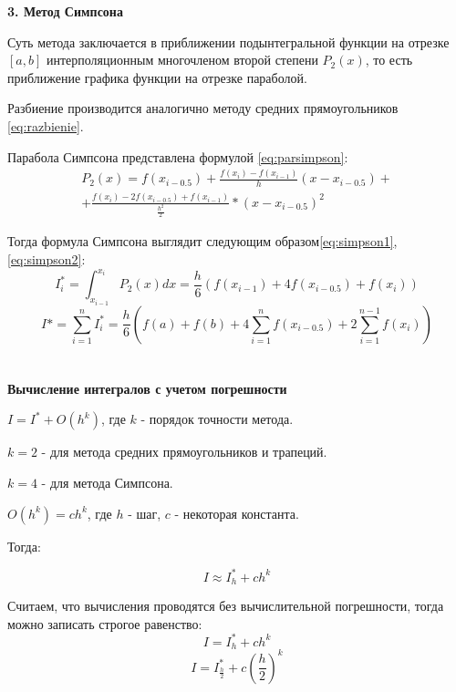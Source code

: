 \documentclass[a4paper, 12pt]{article}   	%
\begin{document}
\textbf{3. Метод Симпсона}

Суть метода заключается в приближении подынтегральной функции на отрезке $[a, b]$
интерполяционным многочленом второй степени $P_2(x)$, то есть приближение графика функции на отрезке параболой.

Разбиение производится аналогично методу средних прямоугольников \eqref{eq:razbienie}.

Парабола Симпсона представлена формулой \eqref{eq:parsimpson}:
\begin{multline}\label{eq:parsimpson}
P_2(x) = f(x_{i-0.5}) + \frac{f(x_i) - f(x_{i-1})}{h}(x-x_{i-0.5}) + \\ 
+ \frac{f(x_i) - 2f(x_{i-0.5}) + f(x_{i-1})}{\frac{h^2}{2}}*(x-x_{i-0.5})^2
\end{multline}

Тогда формула Симпсона выглядит следующим образом\eqref{eq:simpson1}, \eqref{eq:simpson2}:
\begin{equation}\label{eq:simpson1}
I^*_i = \int_{x_{i-1}}^{x_i} P_2(x)dx = \frac{h}{6} (f(x_{i-1}) + 4 f(x_{i-0.5}) + f(x_i))
\end{equation}
\begin{equation}\label{eq:simpson2}
I* = \sum_{i=1}^{n} I^*_i = \frac{h}{6} (f(a) + f(b) + 4\sum_{i=1}^n f(x_{i-0.5}) + 2\sum_{i=1}^{n-1}f(x_i))
\end{equation}
\\\\

\textbf{Вычисление интегралов с учетом погрешности}

$I = I^* + O(h^k)$, где $k$ - порядок точности метода.

$k = 2$ - для метода средних прямоугольников и трапеций.

$k = 4$ - для метода Симпсона.

$O(h^k) = ch^k$, где $h$ - шаг, $c$ - некоторая константа.

Тогда:

\begin{equation*}
I \approx I^*_h + ch^k
\end{equation*}

Считаем, что вычисления проводятся без вычислительной погрешности, тогда можно записать строгое равенство:
\begin{equation}\label{eq:pogr1}
I = I^*_h + ch^k
\end{equation}
\begin{equation}\label{eq:pogr2}
I = I^*_\frac{h}{2} + c{(\frac{h}{2})}^k
\end{equation}
\end{document}
